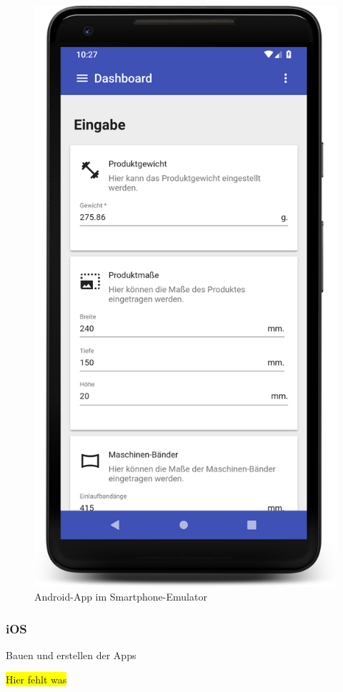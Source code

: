 \begin{figure}[h]
    \centering
    \includegraphics[scale=0.1]{images/kapitel_4/android_app.png}
    \caption{Android-App im Smartphone-Emulator}
    \label{fig:umsetzung_android_app}
\end{figure}

\subsubsection{iOS}
Bauen und erstellen der Apps

\colorbox{yellow}{Hier fehlt was}